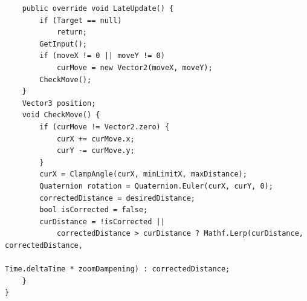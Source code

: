 \documentclass[9pt, b5paper]{article}
\begin{document}
\begin{verbatim}
    public override void LateUpdate() {
        if (Target == null) 
            return;
        GetInput();
        if (moveX != 0 || moveY != 0) 
            curMove = new Vector2(moveX, moveY);
        CheckMove();
    }
    Vector3 position;
    void CheckMove() {
        if (curMove != Vector2.zero) {
            curX += curMove.x;
            curY -= curMove.y;
        }
        curX = ClampAngle(curX, minLimitX, maxDistance);
        Quaternion rotation = Quaternion.Euler(curX, curY, 0);
        correctedDistance = desiredDistance;
        bool isCorrected = false;
        curDistance = !isCorrected ||
            correctedDistance > curDistance ? Mathf.Lerp(curDistance, correctedDistance,
                                                         Time.deltaTime * zoomDampening) : correctedDistance;
    }
}
\end{verbatim}
\end{document}
